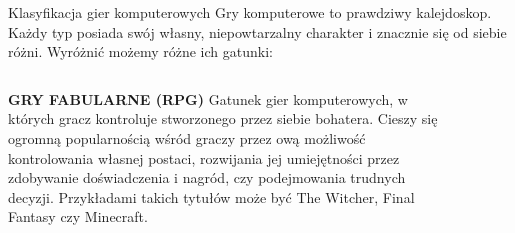 \documentclass{beamer}
\begin{document}
\begin{frame}{Klasyfikacja gier komputerowych} %
 \small Gry komputerowe to prawdziwy kalejdoskop. Każdy typ posiada swój własny,
niepowtarzalny charakter i znacznie się od siebie różni. Wyróżnić możemy różne ich gatunki:

\begin{columns}
\begin{column}{0.5\textwidth}
        \normalsize \textbf {GRY FABULARNE (RPG)}
\newline
\small Gatunek gier komputerowych, w których gracz kontroluje stworzonego przez siebie bohatera. Cieszy się ogromną popularnością wśród graczy przez ową możliwość kontrolowania własnej postaci, rozwijania jej umiejętności przez zdobywanie doświadczenia i nagród, czy podejmowania trudnych decyzji. Przykładami takich tytułów może być The Witcher, Final Fantasy czy Minecraft.

\end{column}
\begin{column}{0.5\textwidth}
    \begin{figure}
    \centering
        \includegraphics[width=4cm,height=5.5cm]{W3.jpg}
\end{figure}
\end{column}
\end{columns}
\end{frame}
\end{document}
